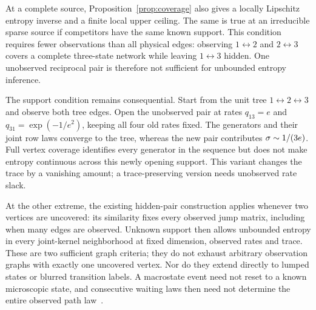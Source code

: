 At a complete source, Proposition~\ref{prop:coverage} also gives a locally
Lipschitz entropy inverse and a finite local upper ceiling. The same is
true at an irreducible sparse source if competitors have the same known
support. This condition requires fewer observations than all physical
edges: observing $1\leftrightarrow2$ and $2\leftrightarrow3$ covers a
complete three-state network while leaving $1\leftrightarrow3$ hidden.
One unobserved reciprocal pair is therefore not sufficient for unbounded
entropy inference.

The support condition remains consequential. Start from the unit tree
$1\leftrightarrow2\leftrightarrow3$ and observe both tree edges. Open
the unobserved pair at rates $q_{13}=e$ and
$q_{31}=\exp(-1/e^2)$, keeping all four old rates fixed. The generators
and their joint row laws converge to the tree, whereas the new pair
contributes $\sigma\sim1/(3e)$. Full vertex coverage identifies every
generator in the sequence but does not make entropy continuous across
this newly opening support. This variant changes the trace by a
vanishing amount; a trace-preserving version needs unobserved rate slack.

At the other extreme, the existing hidden-pair construction applies
whenever two vertices are uncovered: its similarity fixes every observed
jump matrix, including when many edges are observed. Unknown support
then allows unbounded entropy in every joint-kernel neighborhood at fixed
dimension, observed rates and trace. These are two sufficient graph
criteria; they do not exhaust arbitrary observation graphs with exactly
one uncovered vertex. Nor do they extend directly to lumped states or
blurred transition labels. A macrostate event need not reset to a known
microscopic state, and consecutive waiting laws then need not determine
the entire observed path law~\cite{SkinnerDunkel2021PNAS,Bruno2005,FritzSeifert2026}.
